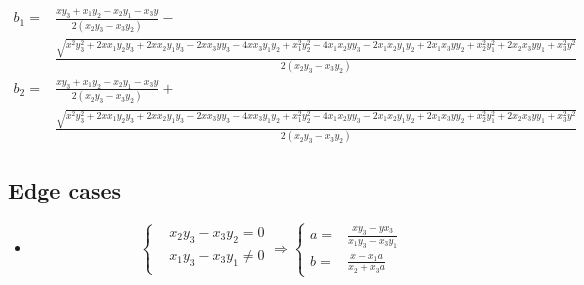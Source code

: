 \documentclass{article}
\begin{document}
\begin{landscape}
    \begin{equation}
        \begin{aligned}
            b_1 = & \frac{x y_{3} + x_{1} y_{2} - x_{2} y_{1} - x_{3} y}{2 \left(x_{2} y_{3} - x_{3} y_{2}\right)} - \\
                  & \frac{\sqrt{x^{2} y_{3}^{2} + 2 x x_{1} y_{2} y_{3} + 2 x x_{2} y_{1} y_{3} - 2 x x_{3} y y_{3} - 4 x x_{3} y_{1} y_{2} + x_{1}^{2} y_{2}^{2} - 4 x_{1} x_{2} y y_{3} - 2 x_{1} x_{2} y_{1} y_{2} + 2 x_{1} x_{3} y y_{2} + x_{2}^{2} y_{1}^{2} + 2 x_{2} x_{3} y y_{1} + x_{3}^{2} y^{2}}}{2 \left(x_{2} y_{3} - x_{3} y_{2}\right)} \\
            b_2 = & \frac{x y_{3} + x_{1} y_{2} - x_{2} y_{1} - x_{3} y}{2 \left(x_{2} y_{3} - x_{3} y_{2}\right)} + \\ 
                  & \frac{\sqrt{x^{2} y_{3}^{2} + 2 x x_{1} y_{2} y_{3} + 2 x x_{2} y_{1} y_{3} - 2 x x_{3} y y_{3} - 4 x x_{3} y_{1} y_{2} + x_{1}^{2} y_{2}^{2} - 4 x_{1} x_{2} y y_{3} - 2 x_{1} x_{2} y_{1} y_{2} + 2 x_{1} x_{3} y y_{2} + x_{2}^{2} y_{1}^{2} + 2 x_{2} x_{3} y y_{1} + x_{3}^{2} y^{2}}}{2 \left(x_{2} y_{3} - x_{3} y_{2}\right)}
        \end{aligned}
    \end{equation}

    \subsection*{Edge cases}

    \begin{itemize}
        \item 
    
        \begin{equation}
            \left\{
            \begin{aligned}
                & x_2 y_3 - x_3 y_2 = 0 \\
                & x_1 y_3 - x_3 y_1 \neq 0 \\
            \end{aligned}
            \right.
            \Rightarrow
            \left\{
            \begin{aligned}
                a = & \frac{x y_3 - y x_3}{x_1 y_3 - x_3 y_1}\\
                b = & \frac{x - x_1 a}{x_2 + x_3 a}     
            \end{aligned}
            \right.
        \end{equation}


\end{itemize}
\end{landscape}
\end{document}
